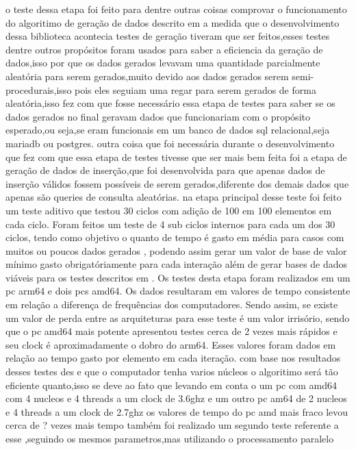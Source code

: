 \documentclass[
	12pt,				%
	openright,			%
	oneside,			%
	a4paper,			%
	english,			%
	french,				%
	spanish,			%
	brazil,				%
	]{abntex2}
\begin{document}
o teste dessa etapa foi feito para dentre outras coisas comprovar o funcionamento do algoritimo de geração de dados descrito em  a medida que o desenvolvimento dessa biblioteca acontecia testes de geração tiveram que ser feitos,esses testes dentre outros propósitos foram usados para saber a eficiencia da geração de dados,isso por que os dados gerados levavam uma quantidade parcialmente aleatória para serem gerados,muito devido aos dados gerados serem semi-procedurais,isso pois eles seguiam uma regar para serem gerados de forma aleatória,isso fez com que fosse necessário essa etapa de testes para saber se os dados gerados no final geravam dados que funcionariam com o propósito esperado,ou seja,se eram funcionais em um banco de dados sql relacional,seja mariadb ou postgres.
outra coisa que foi necessária durante o desenvolvimento que fez com que essa etapa de testes tivesse que ser mais bem feita foi a etapa de geração de dados de inserção,que foi desenvolvida para que apenas dados de inserção válidos fossem possíveis de serem gerados,diferente dos demais dados que apenas são queries de consulta aleatórias.
na etapa principal desse teste foi feito um teste aditivo que testou 30 ciclos com adição de 100 em 100 elementos em cada ciclo. Foram feitos um teste de 4 sub ciclos internos para cada um dos 30 ciclos, tendo como objetivo o quanto de tempo é gasto em média para casos com muitos ou poucos dados gerados , podendo assim gerar um valor de base de valor mínimo gasto obrigatóriamente para cada interação além de gerar bases de dados viáveis para os testes descritos em .\newline
Os testes desta etapa foram realizados em um pc arm64 e dois pcs amd64. Os dados resultaram em valores de tempo consistente em relação a diferença de frequências dos computadores. Sendo assim, se existe um valor de perda entre as arquiteturas para esse teste é um valor irrisório, sendo que o pc amd64 mais potente apresentou testes cerca de 2 vezes mais rápidos e seu clock é aproximadamente o dobro do arm64. Esses valores foram dados em relação ao tempo gasto por elemento em cada iteração.
com base nos resultados desses testes des e que o computador tenha varios núcleos o algoritimo será tão eficiente quanto,isso se deve ao fato que levando em conta o um pc com amd64 com 4 nucleos e 4 threads a um clock de 3.6ghz e um outro pc am64 de 2 nucleos e 4 threads a um clock de 2.7ghz os valores de tempo do pc amd mais fraco levou cerca de ? vezes mais tempo
também foi realizado um segundo teste referente a esse ,seguindo os mesmos parametros,mas utilizando o processamento paralelo
\end{document}
